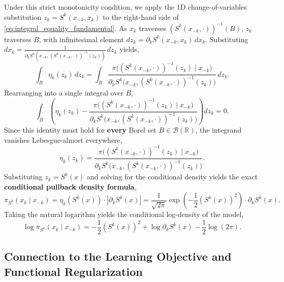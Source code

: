 \documentclass[11pt,a4paper]{article}
\theoremstyle{plain}
\theoremstyle{definition}
\theoremstyle{remark}
\begin{document}
Under this strict monotonicity condition, we apply the 1D change-of-variables substitution $z_k = S^k(x_{-k}, x_k)$ to the right-hand side of \eqref{eq:integral_equality_fundamental}. As $x_k$ traverses $(S^k(x_{-k}, \cdot))^{-1}(B)$, $z_k$ traverses $B$, with infinitesimal element $dz_k = \partial_k S^k(x_{-k}, x_k) \, dx_k$. Substituting $dx_k = \frac{1}{\partial_k S^k(x_{-k}, (S^k(x_{-k}, \cdot))^{-1}(z_k))} \, dz_k$ yields,
\begin{equation}
    \int_B \eta_k(z_k) \, dz_k = \int_B \frac{\pi\Big( (S^k(x_{-k}, \cdot))^{-1}(z_k) \;\Big|\; x_{-k} \Big)}{\partial_k S^k\Big( x_{-k}, (S^k(x_{-k}, \cdot))^{-1}(z_k) \Big)} \, dz_k.
\end{equation}
Rearranging into a single integral over $B$,
\begin{equation}
    \int_B \left( \eta_k(z_k) - \frac{\pi\Big( (S^k(x_{-k}, \cdot))^{-1}(z_k) \;\Big|\; x_{-k} \Big)}{\partial_k S^k\Big( x_{-k}, (S^k(x_{-k}, \cdot))^{-1}(z_k) \Big)} \right) dz_k = 0.
\end{equation}
Since this identity must hold for \textbf{every} Borel set $B \in \mathcal{B}(\mathbb{R})$, the integrand vanishes Lebesgue-almost everywhere,
\begin{equation}
    \eta_k(z_k) = \frac{\pi\Big( (S^k(x_{-k}, \cdot))^{-1}(z_k) \;\Big|\; x_{-k} \Big)}{\partial_k S^k\Big( x_{-k}, (S^k(x_{-k}, \cdot))^{-1}(z_k) \Big)}.
\end{equation}
Substituting $z_k = S^k(x)$ and solving for the conditional density yields the exact \textbf{conditional pullback density formula},
\begin{equation}
    \pi_{S^k}(x_k \mid x_{-k}) = \eta_k(S^k(x)) \cdot |\partial_k S^k(x)| = \frac{1}{\sqrt{2\pi}} \exp\left(-\frac{1}{2}(S^k(x))^2\right) \cdot \partial_k S^k(x).
    \label{eq:pullback_density_result}
\end{equation}
Taking the natural logarithm yields the conditional log-density of the model,
\begin{equation}
    \log \pi_{S^k}(x_k \mid x_{-k}) = -\frac{1}{2}(S^k(x))^2 + \log \partial_k S^k(x) - \frac{1}{2}\log(2\pi).
    \label{eq:cond_log_likelihood}
\end{equation}

\subsection{Connection to the Learning Objective and Functional Regularization}
\end{document}
